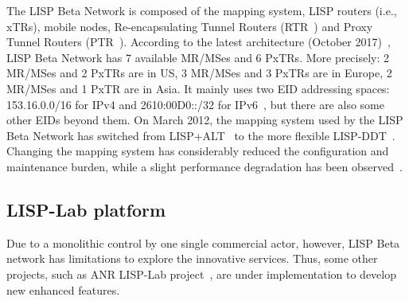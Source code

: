 The LISP Beta Network is composed of the mapping system, LISP routers (i.e., xTRs), mobile nodes, Re-encapsulating Tunnel Routers (RTR~\cite{ermagan2016nat}) and Proxy Tunnel Routers (PTR~\cite{rfc6832}). According to the latest architecture (October 2017)~\cite{lispbetaarchi}, LISP Beta Network has 7 available MR/MSes and 6 PxTRs. More precisely: 2 MR/MSes and 2 PxTRs are in US, 3 MR/MSes and 3 PxTRs are in Europe, 2 MR/MSes and 1 PxTR are in Asia. It mainly uses two EID addressing spaces: 153.16.0.0/16 for IPv4 and 2610:00D0::/32 for IPv6~\cite{lispCCR}, but there are also some other EIDs beyond them. On March  2012, the mapping system used by the LISP Beta Network has switched from LISP+ALT~\cite{rfc6836} to the more flexible LISP-DDT~\cite{lispDDT}. Changing the  mapping system has considerably reduced the configuration and maintenance burden, while a slight performance degradation has been observed~\cite{lispCCR}. %


\subsection{LISP-Lab platform}
\label{subsec:platform_lab}


Due to a monolithic control by one single commercial actor, however, LISP Beta network has limitations to explore the innovative services. Thus, some other projects, such as ANR LISP-Lab project~\cite{lisplab}, are under implementation to develop new enhanced features.

